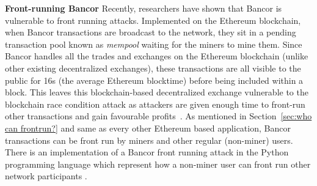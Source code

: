 \par\noindent\textbf{Front-running Bancor} Recently, researchers have shown that Bancor is vulnerable to front running attacks. Implemented on the Ethereum blockchain, when Bancor transactions are broadcast to the network, they sit in a pending transaction pool known as \textit{mempool} waiting for the miners to mine them. Since Bancor handles all the trades and exchanges on the Ethereum blockchain (unlike other existing decentralized exchanges), these transactions are all visible to the public for 16s (the average Ethereum blocktime) before being included within a block. This leaves this blockchain-based decentralized exchange vulnerable to the blockchain race condition attack as attackers are given enough time to front-run other transactions and gain favourable profits~\cite{BancorIs7:online}. As mentioned in Section~\ref{sec:who can frontrun?} and same as every other Ethereum based application, Bancor transactions can be front run by miners and other regular (non-miner) users. There is an implementation of a Bancor front running attack in the Python programming language which represent how a non-miner user can front run other network participants \cite{NewTab13:online}.




